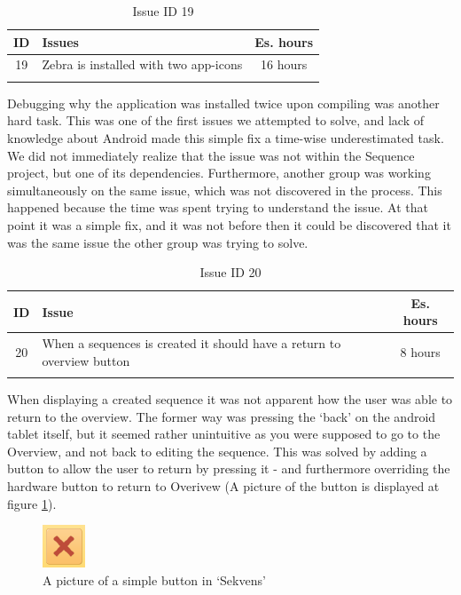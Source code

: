 \begin{longtable} { | c | p{12cm} | c | } 
\hline
	ID 	&	Issues	&		 Es. hours \\\hline
	19	& 	Zebra is installed with two app-icons	&	16 hours	\\\hline
\caption{Issue ID 19}
\label{tab:spr1_issue19}
\end{longtable}
Debugging why the application was installed twice upon compiling was another hard task. This was one of the first issues we attempted to solve, and lack of knowledge about Android made this simple fix a time-wise underestimated task. We did not immediately realize that the issue was not within the Sequence project, but one of its dependencies. Furthermore, another group was working simultaneously on the same issue, which was not discovered in the process. This happened because the time was spent trying to understand the issue. At that point it was a simple fix, and it was not before then it could be discovered that it was the same issue the other group was trying to solve.

\begin{longtable} { | c | p{12cm} | c | } 
\hline
	ID 	&	Issue	&		 Es. hours \\\hline
	20	& 	When a sequences is created it should have a return to overview button	&	8 hours	\\\hline
\caption{Issue ID 20}
\label{tab:spr1_issue20}
\end{longtable}
When displaying a created sequence it was not apparent how the user was able to return to the overview. The former way was pressing the `back' on the android tablet itself, but it seemed rather unintuitive as you were supposed to go to the Overview, and not back to editing the sequence. This was solved by adding a button to allow the user to return by pressing it - and furthermore overriding the hardware button to return to Overivew (A picture of the button is displayed at figure \ref{fig:Old_backButton}).
\begin{figure} [h!]
\centering
\includegraphics{Pics/Sprint1/Gammelt/back_button}
\caption{A picture of a simple button in `Sekvens'}
\label{fig:Old_backButton}
\end{figure} 